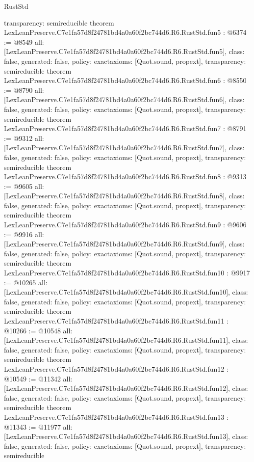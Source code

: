 \begin{lexlean}{RustStd}
\begin{coremodule}
{  transparency: semireducible
}
theorem LexLeanPreserve.C7e1fa57d8f24781bd4a0a60f2bc744d6.R6.RustStd.fun5 : @6374 := @8549 {
  all: [LexLeanPreserve.C7e1fa57d8f24781bd4a0a60f2bc744d6.R6.RustStd.fun5],
  class: false,
  generated: false,
  policy: exact{axioms: [Quot.sound, propext]},
  transparency: semireducible
}
theorem LexLeanPreserve.C7e1fa57d8f24781bd4a0a60f2bc744d6.R6.RustStd.fun6 : @8550 := @8790 {
  all: [LexLeanPreserve.C7e1fa57d8f24781bd4a0a60f2bc744d6.R6.RustStd.fun6],
  class: false,
  generated: false,
  policy: exact{axioms: [Quot.sound, propext]},
  transparency: semireducible
}
theorem LexLeanPreserve.C7e1fa57d8f24781bd4a0a60f2bc744d6.R6.RustStd.fun7 : @8791 := @9312 {
  all: [LexLeanPreserve.C7e1fa57d8f24781bd4a0a60f2bc744d6.R6.RustStd.fun7],
  class: false,
  generated: false,
  policy: exact{axioms: [Quot.sound, propext]},
  transparency: semireducible
}
theorem LexLeanPreserve.C7e1fa57d8f24781bd4a0a60f2bc744d6.R6.RustStd.fun8 : @9313 := @9605 {
  all: [LexLeanPreserve.C7e1fa57d8f24781bd4a0a60f2bc744d6.R6.RustStd.fun8],
  class: false,
  generated: false,
  policy: exact{axioms: [Quot.sound, propext]},
  transparency: semireducible
}
theorem LexLeanPreserve.C7e1fa57d8f24781bd4a0a60f2bc744d6.R6.RustStd.fun9 : @9606 := @9916 {
  all: [LexLeanPreserve.C7e1fa57d8f24781bd4a0a60f2bc744d6.R6.RustStd.fun9],
  class: false,
  generated: false,
  policy: exact{axioms: [Quot.sound, propext]},
  transparency: semireducible
}
theorem LexLeanPreserve.C7e1fa57d8f24781bd4a0a60f2bc744d6.R6.RustStd.fun10 : @9917 := @10265 {
  all: [LexLeanPreserve.C7e1fa57d8f24781bd4a0a60f2bc744d6.R6.RustStd.fun10],
  class: false,
  generated: false,
  policy: exact{axioms: [Quot.sound, propext]},
  transparency: semireducible
}
theorem LexLeanPreserve.C7e1fa57d8f24781bd4a0a60f2bc744d6.R6.RustStd.fun11 : @10266 := @10548 {
  all: [LexLeanPreserve.C7e1fa57d8f24781bd4a0a60f2bc744d6.R6.RustStd.fun11],
  class: false,
  generated: false,
  policy: exact{axioms: [Quot.sound, propext]},
  transparency: semireducible
}
theorem LexLeanPreserve.C7e1fa57d8f24781bd4a0a60f2bc744d6.R6.RustStd.fun12 : @10549 := @11342 {
  all: [LexLeanPreserve.C7e1fa57d8f24781bd4a0a60f2bc744d6.R6.RustStd.fun12],
  class: false,
  generated: false,
  policy: exact{axioms: [Quot.sound, propext]},
  transparency: semireducible
}
theorem LexLeanPreserve.C7e1fa57d8f24781bd4a0a60f2bc744d6.R6.RustStd.fun13 : @11343 := @11977 {
  all: [LexLeanPreserve.C7e1fa57d8f24781bd4a0a60f2bc744d6.R6.RustStd.fun13],
  class: false,
  generated: false,
  policy: exact{axioms: [Quot.sound, propext]},
  transparency: semireducible
}
\end{coremodule}
\end{lexlean}
